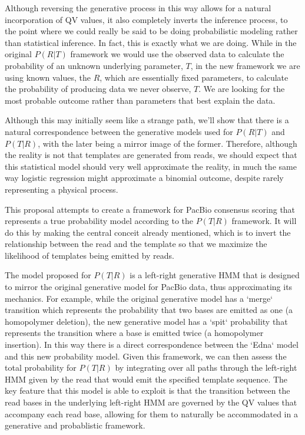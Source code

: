\documentclass[fleqn,10pt]{SelfArx} %
\begin{document}
Although reversing the generative process in this way allows for a natural incorporation of QV values, it also completely inverts the inference process, to the point where we could really be said to be doing probabilistic modeling rather than statistical inference.  In fact, this is exactly what we are doing.  While in the original $P(R|T)$ framework we would use the observed data to calculate the probability of an unknown underlying parameter, $T$, in the new framework we are using known values, the $R$, which are essentially fixed parameters, to calculate the probability of producing data we never observe, $T$.  We are looking for the most probable outcome rather than parameters that best explain the data.

Although this may initially seem like a strange path, we'll show that there is a natural correspondence between the generative models used for $P(R|T)$ and $P(T|R)$, with the later being a mirror image of the former.  Therefore, although the reality is not that templates are generated from reads, we should expect that this statistical model should very well approximate the reality, in much the same way logistic regression might approximate a binomial outcome, despite rarely representing a physical process.

This proposal attempts to create a framework for PacBio consensus scoring that represents a true probability model according to the $P(T|R)$ framework.  It will do this by making the central conceit already mentioned, which is to invert the relationship between the read and the template so that we maximize the likelihood of templates being emitted by reads.

The model proposed for $P(T|R)$ is a left-right generative HMM that is designed to mirror the original generative model for PacBio data, thus approximating its mechanics.  For example, while the original generative model has a `merge` transition which represents the probability that two bases are emitted as one (a homopolymer deletion), the new generative model has a `spit` probability that represents the transition where a base is emitted twice (a homopolymer insertion).  In this way there is a direct correspondence between the `Edna` model and this new probability model.  Given this framework, we can then assess the total probability for $P(T|R)$ by integrating over all paths through the left-right HMM given by the read that would emit the specified template sequence.  The key feature that this model is able to exploit is that the transition between the read bases in the underlying left-right HMM are governed by the QV values that accompany each read base, allowing for them to naturally be accommodated in a generative and probablistic framework.  
\end{document}
